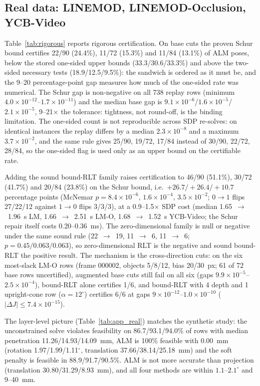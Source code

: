 \subsection{Real data: LINEMOD, LINEMOD-Occlusion, YCB-Video}\label{sec:real}
Table~\ref{tab:rigorous} reports rigorous certification. On base cuts the proven Schur bound certifies 22/90 (24.4\%), 11/72 (15.3\%) and 11/84 (13.1\%) of ALM poses, below the stored one-sided upper bounds (33.3/30.6/33.3\%) and above the two-sided necessary tests (18.9/12.5/9.5\%): the sandwich is ordered as it must be, and the 9--20 percentage-point gap measures how much of the one-sided rate was numerical. The Schur gap is non-negative on all 738 replay rows (minimum $4.0\times10^{-12}$--$1.7\times10^{-11}$) and the median base gap is $9.1\times10^{-6}$/$1.6\times10^{-5}$/$2.1\times10^{-5}$, 9--21$\times$ the tolerance: tightness, not round-off, is the binding limitation. The one-sided count is not reproducible across SDP re-solves: on identical instances the replay differs by a median $2.3\times10^{-8}$ and a maximum $3.7\times10^{-2}$, and the same rule gives 25/90, 19/72, 17/84 instead of 30/90, 22/72, 28/84, so the one-sided flag is used only as an upper bound on the certifiable rate.

Adding the sound bound-RLT family raises certification to 46/90 (51.1\%), 30/72 (41.7\%) and 20/84 (23.8\%) on the Schur bound, i.e.\ $+26.7/+26.4/+10.7$ percentage points (McNemar $p=8.4\times10^{-6}$, $1.6\times10^{-4}$, $3.5\times10^{-2}$; $0\to1$ flips 27/22/12 against $1\to0$ flips 3/3/3), at a 0.9--1.5$\times$ SDP cost (median 1.65~$\to$~1.96~s LM, 1.66~$\to$~2.51~s LM-O, 1.68~$\to$~1.52~s YCB-Video; the Schur repair itself costs 0.20--0.36~ms). The zero-dimensional family is null or negative under the same sound rule (22~$\to$~19, 11~$\to$~6, 11~$\to$~6; $p=0.45/0.063/0.063$), so zero-dimensional RLT is the negative and sound bound-RLT the positive result. The mechanism is the cross-direction cuts: on the six most-slack LM-O rows (frame 000002, objects 5/8/12, bias 20/30~px; 61 of 72 base rows uncertified), augmented base cuts still fail on all six (gaps $9.9\times10^{-5}$--$2.5\times10^{-4}$), bound-RLT alone certifies 1/6, and bound-RLT with 4 depth and 1 upright-cone row ($\alpha=12^\circ$) certifies 6/6 at gaps $9\times10^{-12}$--$1.0\times10^{-10}$ ($|\Delta J|\le7.4\times10^{-15}$).

The layer-level picture (Table~\ref{tab:app_real}) matches the synthetic study: the unconstrained solve violates feasibility on 86.7/93.1/94.0\% of rows with median penetration 11.26/14.93/14.09~mm, ALM is 100\% feasible with 0.00~mm (rotation 1.97/1.99/1.11$^\circ$, translation 37.66/38.14/25.18~mm) and the soft penalty is feasible in 88.9/91.7/90.5\%. ALM is not more accurate than projection (translation 30.80/31.29/8.93~mm), and all four methods are within $1.1$--$2.1^\circ$ and 9--40~mm.

